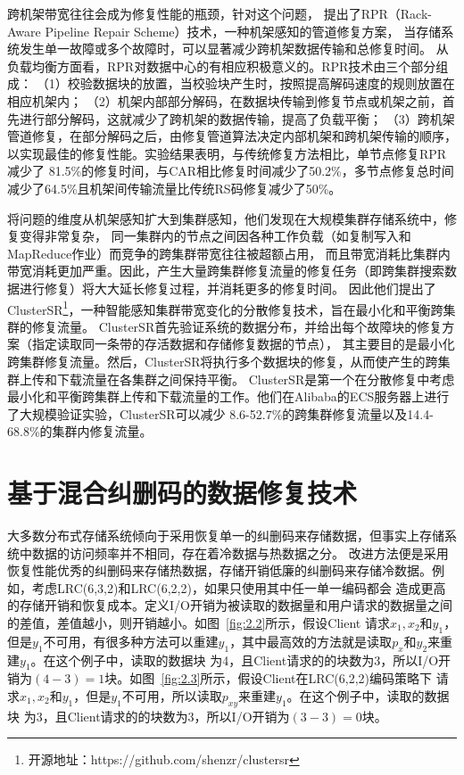 跨机架带宽往往会成为修复性能的瓶颈\cite{chowdhury2013leveraging,dean2004mapreduce}，针对这个问题，
\citet{liu2020rack}提出了RPR（Rack-Aware Pipeline Repair Scheme）技术，一种机架感知的管道修复方案，
当存储系统发生单一故障或多个故障时，可以显著减少跨机架数据传输和总修复时间。
从负载均衡方面看，RPR对数据中心的有相应积极意义的。RPR技术由三个部分组成：
（1）校验数据块的放置，当校验块产生时，按照提高解码速度的规则放置在相应机架内；
（2）机架内部部分解码，在数据块传输到修复节点或机架之前，首先进行部分解码，这就减少了跨机架的数据传输，提高了负载平衡；
（3）跨机架管道修复，在部分解码之后，由修复管道算法决定内部机架和跨机架传输的顺序，以实现最佳的修复性能。实验结果表明，与传统修复方法相比，单节点修复RPR减少了
81.5\%的修复时间，与CAR\cite{shen2016reconsidering}相比修复时间减少了50.2\%，多节点修复总时间减少了64.5\%且机架间传输流量比传统RS码修复减少了50\%。

\citet{shen2020cluster}将问题的维度从机架感知扩大到集群感知，他们发现在大规模集群存储系统中，修复变得非常复杂，
同一集群内的节点之间因各种工作负载（如复制写入和MapReduce作业）而竞争的跨集群带宽往往被超额占用，
而且带宽消耗比集群内带宽消耗更加严重。因此，产生大量跨集群修复流量的修复任务（即跨集群搜索数据进行修复）将大大延长修复过程，并消耗更多的修复时间。
因此他们提出了ClusterSR\footnote{开源地址：https://github.com/shenzr/clustersr}，一种智能感知集群带宽变化的分散修复技术，旨在最小化和平衡跨集群的修复流量。
ClusterSR首先验证系统的数据分布，并给出每个故障块的修复方案（指定读取同一条带的存活数据和存储修复数据的节点），
其主要目的是最小化跨集群修复流量。然后，ClusterSR将执行多个数据块的修复，从而使产生的跨集群上传和下载流量在各集群之间保持平衡。
ClusterSR是第一个在分散修复中考虑最小化和平衡跨集群上传和下载流量的工作。他们在Alibaba的ECS服务器上进行了大规模验证实验，ClusterSR可以减少
8.6-52.7\%的跨集群修复流量以及14.4-68.8\%的集群内修复流量。

\section{基于混合纠删码的数据修复技术}

大多数分布式存储系统倾向于采用恢复单一的纠删码来存储数据，但事实上存储系统中数据的访问频率并不相同，存在着冷数据与热数据之分。
改进方法便是采用恢复性能优秀的纠删码来存储热数据，存储开销低廉的纠删码来存储冷数据。例如，考虑LRC(6,3,2)和LRC(6,2,2)，如果只使用其中任一单一编码都会
造成更高的存储开销和恢复成本。定义I/O开销为被读取的数据量和用户请求的数据量之间的差值，差值越小，则开销越小。如图~\ref{fig:2.2}所示，假设Client
请求$x_1,x_2$和$y_1$，但是$y_1$不可用，有很多种方法可以重建$y_1$，其中最高效的方法就是读取$p_x$和$y_2$来重建$y_1$。在这个例子中，读取的数据块
为4，且Client请求的的块数为3，所以I/O开销为$(4-3)=1$块。如图~\ref{fig:2.3}所示，假设Client在LRC(6,2,2)编码策略下
请求$x_1,x_2$和$y_1$，但是$y_1$不可用，所以读取$p_{xy}$来重建$y_1$。在这个例子中，读取的数据块
为3，且Client请求的的块数为3，所以I/O开销为$(3-3)=0$块。

